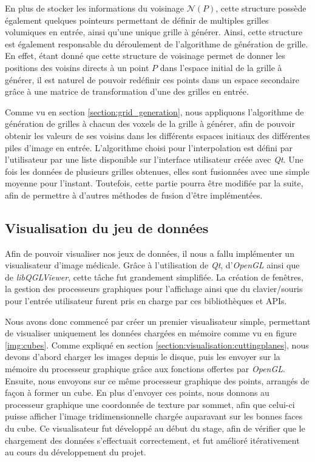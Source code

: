 {{{            En plus de stocker les informations du voisinage $\mathcal{N}(P)$, cette structure possède également quelques pointeurs permettant de définir de multiples grilles volumiques en entrée, ainsi qu'une unique grille à générer. Ainsi, cette structure est également responsable du déroulement de l'algorithme de génération de grille. En effet, étant donné que cette structure de voisinage permet de donner les positions des voisins directs à un point $P$ dans l'espace initial de la grille à générer, il est naturel de pouvoir redéfinir ces points dans un espace secondaire grâce à une matrice de transformation d'une des grilles en entrée.

            Comme vu en section \ref{section:grid_generation}, nous appliquons l'algorithme de génération de grilles à chacun des voxels de la grille à générer, afin de pouvoir obtenir les valeurs de ses voisins dans les différents espaces initiaux des différentes piles d'image en entrée. L'algorithme choisi pour l'interpolation est défini par l'utilisateur par une liste disponible sur l'interface utilisateur créée avec \textit{Qt}. Une fois les données de plusieurs grilles obtenues, elles sont fusionnées avec une simple moyenne pour l'instant. Toutefois, cette partie pourra être modifiée par la suite, afin de permettre à d'autres méthodes de fusion d'être implémentées.
        }

        \subsection{Visualisation du jeu de données}
        {
            Afin de pouvoir visualiser nos jeux de données, il nous a fallu implémenter un visualisateur d'image médicale. Grâce à l'utilisation de \textit{Qt}, d'\textit{OpenGL} ainsi que de \textit{libQGLViewer}, cette tâche fut grandement simplifiée. La création de fenêtres, la gestion des processeurs graphiques pour l'affichage ainsi que du clavier/souris pour l'entrée utilisateur furent pris en charge par ces bibliothèques et APIs.

            Nous avons donc commencé par créer un premier visualisateur simple, permettant de visualiser uniquement les données chargées en mémoire comme vu en figure \ref{img:cubes}. Comme expliqué en section \ref{section:visualisation:cuttingplanes}, nous devons d'abord charger les images depuis le disque, puis les envoyer sur la mémoire du processeur graphique grâce aux fonctions offertes par \textit{OpenGL}. Ensuite, nous envoyons sur ce même processeur graphique des points, arrangés de façon à former un cube. En plus d'envoyer ces points, nous donnons au processeur graphique une coordonnée de texture par sommet, afin que celui-ci puisse afficher l'image tridimensionnelle chargée auparavant sur les bonnes faces du cube. Ce visualisateur fut développé au début du stage, afin de vérifier que le chargement des données s'effectuait correctement, et fut amélioré itérativement au cours du développement du projet.

}}}
